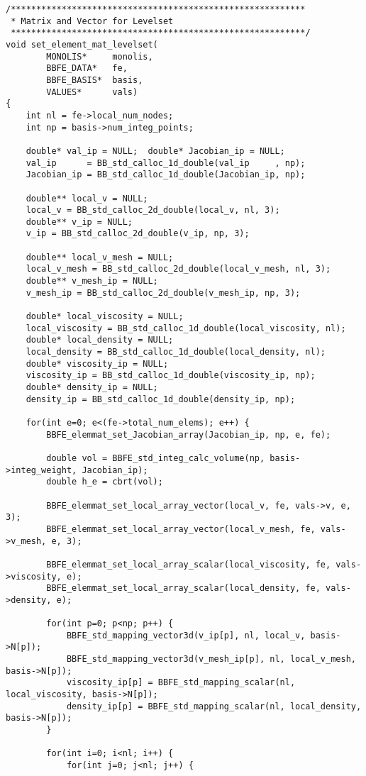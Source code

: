 \begin{lstlisting}[caption = mlflow\_fs.cの中のレベルセット関数の係数行列を計算する関数]
/**********************************************************
 * Matrix and Vector for Levelset 
 **********************************************************/
void set_element_mat_levelset(
		MONOLIS*     monolis,
		BBFE_DATA*   fe,
		BBFE_BASIS*  basis,
		VALUES*      vals)
{
	int nl = fe->local_num_nodes;
	int np = basis->num_integ_points;

	double* val_ip = NULL;  double* Jacobian_ip = NULL;
	val_ip      = BB_std_calloc_1d_double(val_ip     , np);
	Jacobian_ip = BB_std_calloc_1d_double(Jacobian_ip, np);

	double** local_v = NULL;
	local_v = BB_std_calloc_2d_double(local_v, nl, 3);
	double** v_ip = NULL; 
	v_ip = BB_std_calloc_2d_double(v_ip, np, 3);

	double** local_v_mesh = NULL;
	local_v_mesh = BB_std_calloc_2d_double(local_v_mesh, nl, 3);
	double** v_mesh_ip = NULL; 
	v_mesh_ip = BB_std_calloc_2d_double(v_mesh_ip, np, 3);

	double* local_viscosity = NULL;
	local_viscosity = BB_std_calloc_1d_double(local_viscosity, nl);
	double* local_density = NULL;
	local_density = BB_std_calloc_1d_double(local_density, nl);
	double* viscosity_ip = NULL;
	viscosity_ip = BB_std_calloc_1d_double(viscosity_ip, np);
	double* density_ip = NULL;
	density_ip = BB_std_calloc_1d_double(density_ip, np);

	for(int e=0; e<(fe->total_num_elems); e++) {
		BBFE_elemmat_set_Jacobian_array(Jacobian_ip, np, e, fe);

		double vol = BBFE_std_integ_calc_volume(np, basis->integ_weight, Jacobian_ip);
		double h_e = cbrt(vol);

		BBFE_elemmat_set_local_array_vector(local_v, fe, vals->v, e, 3);
		BBFE_elemmat_set_local_array_vector(local_v_mesh, fe, vals->v_mesh, e, 3);

		BBFE_elemmat_set_local_array_scalar(local_viscosity, fe, vals->viscosity, e);
		BBFE_elemmat_set_local_array_scalar(local_density, fe, vals->density, e);

		for(int p=0; p<np; p++) {
			BBFE_std_mapping_vector3d(v_ip[p], nl, local_v, basis->N[p]);
			BBFE_std_mapping_vector3d(v_mesh_ip[p], nl, local_v_mesh, basis->N[p]);
			viscosity_ip[p] = BBFE_std_mapping_scalar(nl, local_viscosity, basis->N[p]);
			density_ip[p] = BBFE_std_mapping_scalar(nl, local_density, basis->N[p]);
		}

		for(int i=0; i<nl; i++) {
			for(int j=0; j<nl; j++) {


\end{lstlisting}

